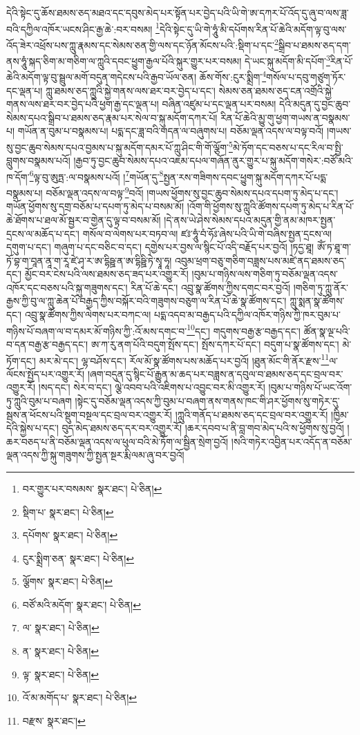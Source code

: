 དེའི་སྟེང་དུ་ཆོས་ཐམས་ཅད་མཐའ་དང་དབུས་མེད་པར་སྟོན་པར་བྱེད་པའི་ཡི་གེ་ཨ་དཀར་པོ་འོད་དུ་ཞུ་བ་ལས་ཟླ་བའི་དཀྱིལ་འཁོར་ཡངས་ཤིང་རྒྱ་ཆེ་:བར་བསམ། \footnote{བར་གྱུར་པར་བསམས་  སྣར་ཐང་།  པེ་ཅིན། }དེའི་སྟེང་དུ་ཡི་གེ་ཧཱུཾ་མི་དཔོགས་རིན་པོ་ཆེའི་མདོག་ལྟ་བུ་ལས་འོད་ཟེར་འཕྲོས་པས་ཀླུ་རྣམས་དང་སེམས་ཅན་གྱི་ལས་དང་ཉོན་མོངས་པའི་:སྡིག་པ་དང་\footnote{སྡིག་པ་  སྣར་ཐང་།  པེ་ཅིན། }སྒྲིབ་པ་ཐམས་ཅད་དག་ནས་ཧཱུཾ་སྐད་ཅིག་མ་གཅིག་ལ་ཀླུའི་དབང་ཕྱུག་རྒྱལ་པོའི་སྐུར་གྱུར་པར་བསམ། དེ་ཡང་སྐུ་མདོག་མི་དཔོག་\footnote{དཔོགས་  སྣར་ཐང་།  པེ་ཅིན། }རིན་པོ་ཆེའི་མདོག་ལྟ་བུ་སྦྲུལ་མགོ་བདུན་གདེངས་པའི་རྒྱབ་ཡོལ་ཅན། ཆོས་གོས་:ངུར་སྨྲིག་\footnote{ངུར་སྨྲིག་ཅན་  སྣར་ཐང་།  པེ་ཅིན། }གསོལ་པ་དབུ་གཙུག་ཏོར་དང་ལྡན་པ། ཀླུ་ཐམས་ཅད་ཀླུའི་སྐྱེ་གནས་ལས་ཐར་བར་བྱེད་པ་དང་། སེམས་ཅན་ཐམས་ཅད་ངན་འགྲོའི་སྐྱེ་གནས་ལས་ཐར་བར་བྱེད་པའི་ཕྱག་རྒྱ་དང་ལྡན་པ། བཞིན་འཛུམ་པ་དང་ལྡན་པར་བསམ། དེའི་མདུན་དུ་བྱང་ཆུབ་སེམས་དཔའ་སྒྲིབ་པ་ཐམས་ཅད་རྣམ་པར་སེལ་བ་སྐུ་མདོག་དཀར་པོ། རིན་པོ་ཆེའི་མྱུ་གུ་ཕྱག་གཡས་ན་བསྣམས་པ། གཡོན་ན་བུམ་པ་བསྣམས་པ། པདྨ་དང་ཟླ་བའི་གདན་ལ་བཞུགས་པ། བཅོམ་ལྡན་འདས་ལ་བལྟ་བའོ། །གཡས་སུ་བྱང་ཆུབ་སེམས་དཔའ་བྱམས་པ་སྐུ་མདོག་དམར་པོ་ཀླུ་ཤིང་གི་གོ་ལྕོག་\footnote{ལྕོགས་  སྣར་ཐང་།  པེ་ཅིན། }མེ་ཏོག་དང་བཅས་པ་དང་རིལ་བ་སྤྱི་བླུགས་བསྣམས་པའོ། །རྒྱབ་ཏུ་བྱང་ཆུབ་སེམས་དཔའ་འཇམ་དཔལ་གཞོན་ནུར་གྱུར་པ་སྐུ་མདོག་གསེར་:བཙོ་མའི་ཁ་དོག་\footnote{བཙོ་མའི་མདོག་  སྣར་ཐང་།  པེ་ཅིན། }ལྟ་བུ་ཨུཏྤ་:ལ་བསྣམས་པའོ། །\footnote{ལ་  སྣར་ཐང་།  པེ་ཅིན། }གཡོན་དུ་\footnote{ན་  སྣར་ཐང་།  པེ་ཅིན། }སྤྱན་རས་གཟིགས་དབང་ཕྱུག་སྐུ་མདོག་དཀར་པོ་པདྨ་བསྣམས་པ། བཅོམ་ལྡན་འདས་ལ་བལྟ་\footnote{ལྟ་  སྣར་ཐང་།  པེ་ཅིན། }བའོ། །གཡས་ཕྱོགས་སུ་བྱང་ཆུབ་སེམས་དཔའ་དཔག་ཏུ་མེད་པ་དང་། གཡོན་ཕྱོགས་སུ་དགྲ་བཅོམ་པ་དཔག་ཏུ་མེད་པ་བསམ་མོ། །འོག་གི་ཕྱོགས་སུ་ཀླུའི་ཚོགས་དཔག་ཏུ་མེད་པ་རིན་པོ་ཆེ་ཐོགས་པ་ཐལ་མོ་སྦྱར་བ་གྱེན་དུ་ལྟ་བ་བསམ་མོ། །དེ་ནས་ཡེ་ཤེས་སེམས་དཔའ་མདུན་གྱི་ནམ་མཁར་སྤྱན་དྲངས་ལ་མཆོད་པ་དང་། གསོལ་བ་ལེགས་པར་བཏབ་ལ། ཛཿ་ཧཱུཾ་བཾ་ཧོཿ་ཞེས་པའི་ཡི་གེ་བཞིས་སྤྱན་དྲངས་ལ། དགུག་པ་དང་། གཞུག་པ་དང་བཅིང་བ་དང་། དགྱེས་པར་བྱས་ལ་སྙིང་པོ་འདི་བརྗོད་པར་བྱའོ། །ཏདྱ་ཐཱ། ཨོཾ་ཏ་ཐཱ་ག་ཏོ་བྷ་ག་བཱན་ནཱ་ག་རཱ་ཛེ་ཤྭ་ར་ཨ་དྷིཥྛ་ན་ཨ་དྷིཥྛི་ཏེ་སྭཱ་ཧཱ། འབུམ་ཕྲག་བཅུ་གཅིག་བཟླས་པས་མཛེ་ནད་ཐམས་ཅད་དང་། མྱོང་བར་ངེས་པའི་ལས་ཐམས་ཅད་ཟད་པར་འགྱུར་རོ། །བུམ་པ་གཉིས་ལས་གཅིག་ཏུ་བཅོམ་ལྡན་འདས་འཁོར་དང་བཅས་པའི་སྐུ་གཟུགས་དང་། རིན་པོ་ཆེ་དང་། འབྲུ་སྣ་ཚོགས་ཀྱིས་དགང་བར་བྱའོ། །གཅིག་ཏུ་ཀླུ་ནོར་རྒྱས་ཀྱི་བུ་ལ་ཀླུ་ཆེན་པོ་བརྒྱད་ཀྱིས་བསྐོར་བའི་གཟུགས་བཅུག་ལ་རིན་པོ་ཆེ་སྣ་ཚོགས་དང་། ཀླུ་སྨན་སྣ་ཚོགས་དང་། འབྲུ་སྣ་ཚོགས་ཀྱིས་ལེགས་པར་བཀང་ལ། པདྨ་འདབ་མ་བརྒྱད་པའི་དཀྱིལ་འཁོར་གཉིས་ཀྱི་ཁར་བུམ་པ་གཉིས་པོ་བཞག་ལ་བ་དམར་མོ་གཉིས་ཀྱི་:འོ་མས་དགང་བ་\footnote{འོ་མ་མགོད་པ་  སྣར་ཐང་།  པེ་ཅིན། }དང་། གདུགས་བརྒྱ་རྩ་བརྒྱད་དང་། ཚོན་སྣ་ལྔ་པའི་བ་དན་བརྒྱ་རྩ་བརྒྱད་དང་། ཨ་ཀ་རུ་ནག་པོའི་བདུག་སྤོས་དང་། སྤོས་དཀར་པོ་དང་། བདུག་པ་སྣ་ཚོགས་དང་། མེ་ཏོག་དང་། མར་མེ་དང་། ལྷ་བཤོས་དང་། རོལ་མོ་སྣ་ཚོགས་པས་མཆོད་པར་བྱའོ། །ཐུན་མོང་གི་ནོར་རྫས་\footnote{བརྫས་  སྣར་ཐང་། }ལ་ལོངས་སྤྱོད་པར་འགྱུར་རོ། །ཞག་བདུན་དུ་སྙིང་པོ་རྒྱུན་མ་ཆད་པར་བཟླས་ན་དབུལ་བ་ཐམས་ཅད་དང་བྲལ་བར་འགྱུར་རོ། །སད་དང་། སེར་བ་དང་། ལྕེ་འབབ་པའི་འཇིགས་པ་འབྱུང་བར་མི་འགྱུར་རོ། །བུམ་པ་གཉིས་པོ་ཡང་འོག་ཏུ་ཀླུའི་བུམ་པ་བཞག །སྟེང་དུ་བཅོམ་ལྡན་འདས་ཀྱི་བུམ་པ་བཞག་ནས་གནས་ཁང་གི་ཤར་ཕྱོགས་སུ་གཏེར་དུ་སྦས་ན་ཕོངས་པའི་སྡུག་བསྔལ་དང་བྲལ་བར་འགྱུར་རོ། །ཀླུའི་གནོད་པ་ཐམས་ཅད་དང་བྲལ་བར་འགྱུར་རོ། །ཁྱིམ་དེའི་སྐྱེས་པ་དང་། བུད་མེད་ཐམས་ཅད་དར་བར་འགྱུར་རོ། །ཆར་དབབ་པ་ནི་བླ་གབ་མེད་པའི་ས་ཕྱོགས་སུ་བྱའོ། །ཆར་བཅད་པ་ནི་བཅོམ་ལྡན་འདས་ལ་ཕུལ་བའི་མེ་ཏོག་ལ་སྦྱིན་སྲེག་བྱའོ། །སའི་གཏེར་འབྱིན་པར་འདོད་ན་བཅོམ་ལྡན་འདས་ཀྱི་སྐུ་གཟུགས་ཀྱི་སྤྱན་སྔར་རྨི་ལམ་ཞུ་བར་བྱའོ། 
